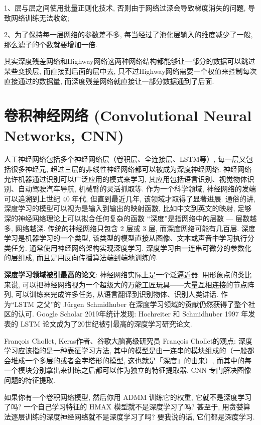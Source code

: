1、层与层之间使用批量正则化技术, 否则由于网络过深会导致梯度消失的问题, 导致网络训练无法收敛;

2、为了保持每一层网络的参数差不多, 每当经过了池化层输入的维度减少了一般, 那么滤子的个数就要增加一倍.

其实深度残差网络和Highway网络这两种网络结构都能够让一部分的数据可以跳过某些变换层, 而直接到后面的层中去, 只不过Highway网络需要一个权值来控制每次直接通过的数据量, 而深度残差网络就直接让一部分数据通到了后面.
\section{卷积神经网络 (Convolutional Neural Networks, CNN)}
人工神经网络包括多个神经网络层（卷积层、全连接层、LSTM等）, 每一层又包括很多神经元, 超过三层的非线性神经网络都可以被成为深度神经网络.
神经网络允许机器通过识别可以广泛应用的模式来学习, 其应用包括语言识别、视觉物体识别、自动驾驶汽车导航, 机械臂的灵活抓取等. 作为一个科学领域, 神经网络的发端可以追溯到上世纪 40 年代, 但直到最近几年, 该领域才取得了显著进展.
通俗的讲, 深度学习的模型可以视为是输入到输出的映射函数, 比如中文到英文的映射, 足够深的神经网络理论上可以拟合任何复杂的函数
“深度”是指网络中的层数 — 层数越多, 网络越深. 传统的神经网络只包含 2 层或 3 层, 而深度网络可能有几百层.
深度学习是机器学习的一个类型, 该类型的模型直接从图像、文本或声音中学习执行分类任务. 通常使用神经网络架构实现深度学习.
深度学习由一连串可微分的参数化的层组成, 而且是用反向传播算法端到端地训练的.
\begin{remark}
\textbf{深度学习领域被引最高的论文}:
神经网络实际上是一个泛逼近器. 用形象点的类比来说, 可以把神经网络视为一个超级大的万能工匠玩具——大量互相连接的节点阵列, 可以训练来完成许多任务, 从语言翻译到识别物体、识别人类讲话.
作为“LSTM 之父”的 Jürgen Schmidhuber 在深度学习领域的贡献仍然获得了整个社区的认可.
Google Scholar 2019年统计发现:  Hochreiter 和 Schmidhuber 1997 年发表的 LSTM 论文成为了20世纪被引最高的深度学习研究论文\cite{HochreiterNC1997}.
\end{remark}

François Chollet, Keras作者、谷歌大脑高级研究员 François Chollet的观点: 深度学习应该指的是一种表征学习方法, 其中的模型是由一连串的模块组成的（一般都会堆成一个多层的或者金字塔形的模型, 这也就是「深度」的由来）, 而其中的每一个模块分别拿出来训练之后都可以作为独立的特征提取器. CNN 专门解决图像问题的特征提取.
\begin{example}
  如果你有一个卷积网络模型, 然后你用 ADMM 训练它的权重, 它就不是深度学习了吗? 一个自己学习特征的 HMAX 模型就不是深度学习了吗? 甚至于, 用贪婪算法逐层训练的深度神经网络就不是深度学习了吗? 要我说的话, 它们都是深度学习.
\end{example}

